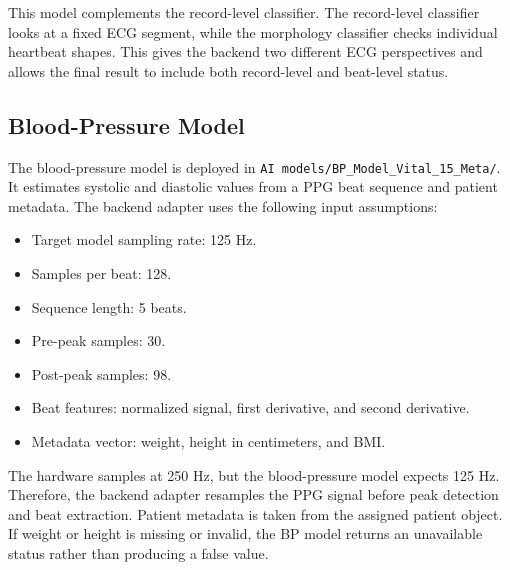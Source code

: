 This model complements the record-level classifier. The record-level classifier looks at a fixed ECG segment, while the morphology classifier checks individual heartbeat shapes. This gives the backend two different ECG perspectives and allows the final result to include both record-level and beat-level status.

\subsection{Blood-Pressure Model}

The blood-pressure model is deployed in \texttt{AI models/BP\_Model\_Vital\_15\_Meta/}. It estimates systolic and diastolic values from a PPG beat sequence and patient metadata. The backend adapter uses the following input assumptions:

\begin{itemize}
    \item Target model sampling rate: 125 Hz.
    \item Samples per beat: 128.
    \item Sequence length: 5 beats.
    \item Pre-peak samples: 30.
    \item Post-peak samples: 98.
    \item Beat features: normalized signal, first derivative, and second derivative.
    \item Metadata vector: weight, height in centimeters, and BMI.
\end{itemize}

The hardware samples at 250 Hz, but the blood-pressure model expects 125 Hz. Therefore, the backend adapter resamples the PPG signal before peak detection and beat extraction. Patient metadata is taken from the assigned patient object. If weight or height is missing or invalid, the BP model returns an unavailable status rather than producing a false value.

